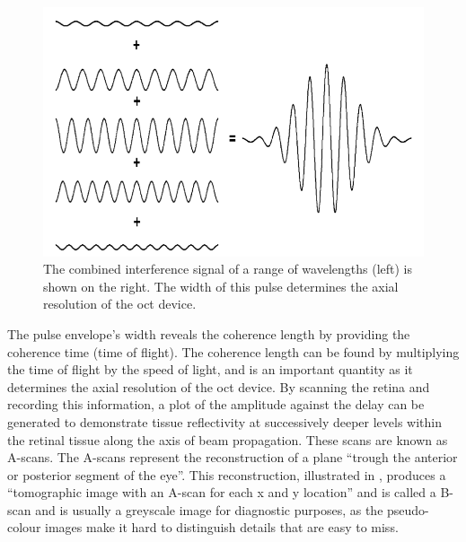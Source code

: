 \begin{figure}[H]
\centering
\includegraphics{figures/morgan_2}
\caption{The combined interference signal of a range of wavelengths (left) is 
shown on the right.  The width of this pulse determines the axial resolution of 
the \Gls{oct} device. \cite{mbib_6} }
\label{fig:m_2}
\end{figure}

The pulse envelope's width reveals the coherence length by providing
the coherence time (time of flight).  The coherence length can be found
by multiplying the time of flight by the speed of light, and is an
important quantity as it determines the axial resolution of the \gls{oct}
device. \cite{mbib_6}  By scanning the retina and recording this
information, a plot of the amplitude against the delay can be generated to
demonstrate tissue reflectivity at successively deeper levels within the
retinal tissue along the axis of beam propagation. \cite{mbib_6}
These scans are known as A-scans.  The A-scans represent the
reconstruction of a plane \enquote{trough the anterior or posterior segment
of the eye}.\cite{mbib_6} This reconstruction, illustrated in , produces
a \enquote{tomographic image with an A-scan for each x and y location} and is called
a B-scan and is usually a greyscale image for diagnostic purposes, as the pseudo-colour
images make it hard to distinguish details that are easy to miss. \cite{mbib_5,mbib_4,mbib_7}


